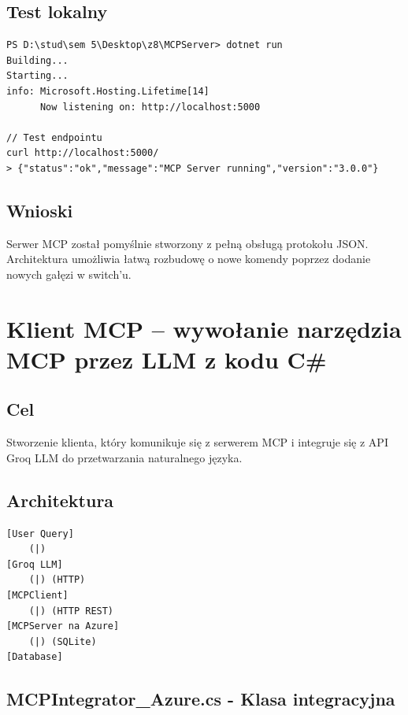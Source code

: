 \documentclass[twoside]{article}
\begin{document}
\subsection{Test lokalny}

\begin{verbatim}
PS D:\stud\sem 5\Desktop\z8\MCPServer> dotnet run
Building...
Starting...
info: Microsoft.Hosting.Lifetime[14]
      Now listening on: http://localhost:5000

// Test endpointu
curl http://localhost:5000/
> {"status":"ok","message":"MCP Server running","version":"3.0.0"}
\end{verbatim}

\subsection{Wnioski}

Serwer MCP został pomyślnie stworzony z pełną obsługą protokołu JSON. Architektura umożliwia łatwą rozbudowę o nowe komendy poprzez dodanie nowych gałęzi w switch'u.

\section{Klient MCP – wywołanie narzędzia MCP przez LLM z kodu C\#}

\subsection{Cel}
Stworzenie klienta, który komunikuje się z serwerem MCP i integruje się z API Groq LLM do przetwarzania naturalnego języka.

\subsection{Architektura}

\begin{verbatim}
[User Query]
    (|)
[Groq LLM]
    (|) (HTTP)
[MCPClient]
    (|) (HTTP REST)
[MCPServer na Azure]
    (|) (SQLite)
[Database]
\end{verbatim}

\subsection{MCPIntegrator\_Azure.cs - Klasa integracyjna}
\end{document}
